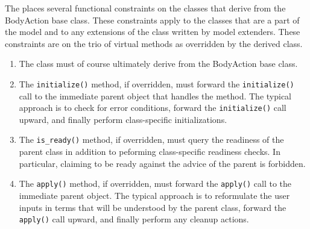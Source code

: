 The \ModelDesc places several functional constraints on the classes
that derive from the BodyAction base class.
These constraints apply to the classes that are a part of the model
and to any extensions of the class written by model extenders.
These constraints are on the trio of virtual methods as overridden
by the derived class.
\begin{enumerate}
\item The class must of course ultimately derive from the BodyAction base class.
\item The {\tt initialize()} method, if overridden,
must forward the {\tt initialize()} call to the immediate parent object
that handles the method.
The typical approach is to check for error conditions,
forward the {\tt initialize()} call upward, and finally perform
class-specific initializations.
\item The {\tt is\_ready()} method, if overridden,
must query the readiness of the parent class in addition to
peforming class-specific readiness checks. In particular, claiming to be ready
against the advice of the parent is forbidden.
\item The {\tt apply()} method, if overridden,
must forward the {\tt apply()} call to the immediate parent object.
The typical approach is to reformulate the user inputs in terms
that will be understood by the parent class,
forward the {\tt apply()} call  upward, and finally perform
any cleanup actions.
\end{enumerate}
